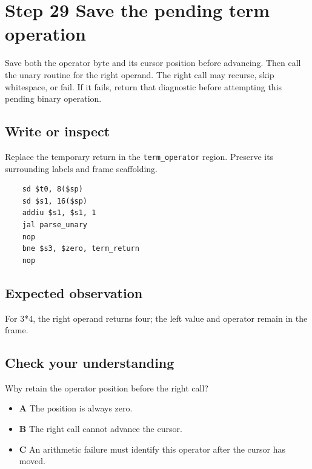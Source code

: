 \section{Step 29 Save the pending term operation}\label{expression-s29}

Save both the operator byte and its cursor position before advancing. Then call the unary routine for the right operand. The right call may recurse, skip whitespace, or fail. If it fails, return that diagnostic before attempting this pending binary operation.

\subsection{Write or inspect}
Replace the temporary return in the \texttt{term\_operator} region. Preserve its surrounding labels and frame scaffolding.

\begin{verbatim}
    sd $t0, 8($sp)
    sd $s1, 16($sp)
    addiu $s1, $s1, 1
    jal parse_unary
    nop
    bne $s3, $zero, term_return
    nop
\end{verbatim}
\subsection{Expected observation}
For 3*4, the right operand returns four; the left value and operator remain in the frame.

\subsection{Check your understanding}
Why retain the operator position before the right call?

\begin{itemize}
  \item \textbf{A} The position is always zero.
  \item \textbf{B} The right call cannot advance the cursor.
  \item \textbf{C} An arithmetic failure must identify this operator after the cursor has moved.
\end{itemize}
